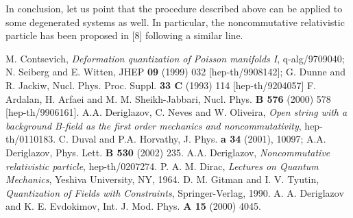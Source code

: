\documentclass[paper a4]{article}
\begin{document}
In conclusion, let us point that the procedure described above can be
applied to some degenerated systems as well. In particular, the
noncommutative relativistic particle has been proposed in [8]
following a similar line.

\begin{thebibliography}{nn}
\bibitem{} M. Contsevich, {\em Deformation quantization of Poisson
manifolds I}, q-alg/9709040;
\bibitem{} N. Seiberg and E. Witten,
JHEP {\bf 09} (1999) 032 [hep-th/9908142];
\bibitem{} G. Dunne and R. Jackiw, Nucl. Phys. Proc. Suppl.
{\bf 33 C} (1993) 114 [hep-th/9204057]
\bibitem{} F. Ardalan, H. Arfaei and M. M. Sheikh-Jabbari,
Nucl. Phys. {\bf B 576} (2000) 578 [hep-th/9906161].
\bibitem{} A.A. Deriglazov, C. Neves and W. Oliveira, {\em Open string
with a background B-field as the first order mechanics and
noncommutativity}, hep-th/0110183.
\bibitem{} C. Duval and P.A. Horvathy, J. Phys. {\bf a 34} (2001),
10097;
\bibitem{} A.A. Deriglazov, Phys. Lett. {\bf B 530} (2002) 235.
\bibitem{} A.A. Deriglazov, {\em Noncommutative relativistic particle},
hep-th/0207274.
\bibitem{} P. A. M. Dirac, {\em Lectures on Quantum Mechanics},
Yeshiva University, NY, 1964.
\bibitem{} D. M. Gitman and I. V. Tyutin, {\em Quantization of Fields
with Constraints}, Springer-Verlag, 1990.
\bibitem{} A. A. Deriglazov and K. E. Evdokimov, Int. J. Mod. Phys.
{\bf A 15} (2000) 4045.
\end{thebibliography}
\end{document}
